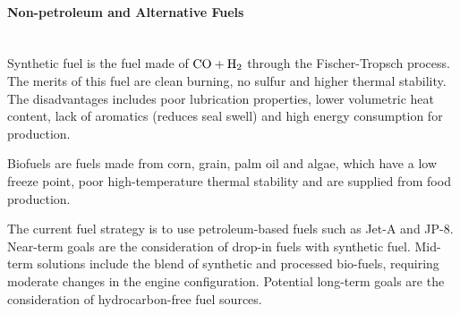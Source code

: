 \paragraph{Non-petroleum and Alternative Fuels} \mbox{} \\[0.5em]
Synthetic fuel is the fuel made of $\mathrm{CO}+\mathrm{H_2}$ through the Fischer-Tropsch process. The merits of this fuel are clean burning, no sulfur and higher thermal stability. The disadvantages includes poor lubrication properties, lower volumetric heat content, lack of aromatics (reduces seal swell) and high energy consumption for production.

Biofuels are fuels made from corn, grain, palm oil and algae, which have a low freeze point, poor high-temperature thermal stability and are supplied from food production. 

The current fuel strategy is to use petroleum-based fuels such as Jet-A and JP-8. Near-term goals are the consideration of drop-in fuels with synthetic fuel. Mid-term solutions include the blend of synthetic and processed bio-fuels, requiring moderate changes in the engine configuration. Potential long-term goals are the consideration of hydrocarbon-free fuel sources. 
